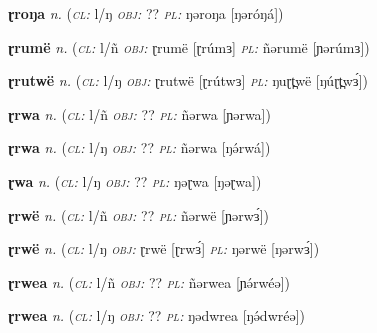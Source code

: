 \newentry
\headword\textbf{ɽroŋa}  
\ipa{[ɽróŋá]}
\synpos\textit{n.} 
\class(\textit{\textsc{cl:}} {l/ŋ}
\object\textit{\textsc{obj:}} ??
\plural\textit{\textsc{pl:}} ŋəroŋa [ŋəróŋá]) 

\newentry
\headword\textbf{ɽrumë}  
\ipa{[ɽrúmɜ]}
\synpos\textit{n.} 
\class(\textit{\textsc{cl:}} {l/ñ}
\object\textit{\textsc{obj:}} ɽrumë [ɽrúmɜ]
\plural\textit{\textsc{pl:}} ñərumë [ɲərúmɜ]) 

\newentry
\headword\textbf{ɽrutwë}  
\ipa{[ɽrut̪wɜ́]}
\synpos\textit{n.} 
\class(\textit{\textsc{cl:}} {l/ŋ}
\object\textit{\textsc{obj:}} ɽrutwë [ɽrútwɜ]
\plural\textit{\textsc{pl:}} ŋuɽt̪wë [ŋúɽt̪wɜ́]) 


\newentry
\headword\textbf{ɽrwa}  
\ipa{[ɽrwa]}
\synpos\textit{n.} 
\class(\textit{\textsc{cl:}} {l/ñ}
\object\textit{\textsc{obj:}} ??
\plural\textit{\textsc{pl:}} ñərwa [ɲərwa]) 

\newentry
\headword\textbf{ɽrwa}  
\ipa{[ɽŕwá]}
\synpos\textit{n.} 
\class(\textit{\textsc{cl:}} {l/ŋ}
\object\textit{\textsc{obj:}} ??
\plural\textit{\textsc{pl:}} ñərwa [ŋə́rwá]) 

\newentry
\headword\textbf{ɽwa}  
\ipa{[ɽwa]}
\synpos\textit{n.} 
\class(\textit{\textsc{cl:}} {l/ŋ}
\object\textit{\textsc{obj:}} ??
\plural\textit{\textsc{pl:}} ŋəɽwa [ŋəɽwa]) 




\newentry
\headword\textbf{ɽrwë}  
\ipa{[ɽrwɜ́]}
\synpos\textit{n.} 
\class(\textit{\textsc{cl:}} {l/ñ}
\object\textit{\textsc{obj:}} ??
\plural\textit{\textsc{pl:}} ñərwë [ɲərwɜ́]) 

\newentry
\headword\textbf{ɽrwë}  
\ipa{[ɽrwɜ́]}
\synpos\textit{n.} 
\class(\textit{\textsc{cl:}} {l/ŋ}
\object\textit{\textsc{obj:}} ɽrwë [ɽrwɜ́]
\plural\textit{\textsc{pl:}} ŋərwë [ŋərwɜ́]) 

\newentry
\headword\textbf{ɽrwea}  
\ipa{[ɽrwéə]}
\synpos\textit{n.} 
\class(\textit{\textsc{cl:}} {l/ñ}
\object\textit{\textsc{obj:}} ??
\plural\textit{\textsc{pl:}} ñərwea [ɲə́rwéə]) 

\newentry
\headword\textbf{ɽrwea}  
\ipa{[ɽrwéə]}
\synpos\textit{n.} 
\class(\textit{\textsc{cl:}} {l/ŋ}
\object\textit{\textsc{obj:}} ??
\plural\textit{\textsc{pl:}} ŋədwrea [ŋə́dwréə]) 

